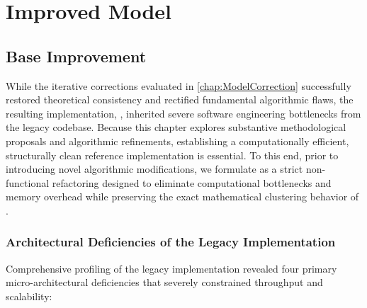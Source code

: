 \chapter{Improved Model}
\label{chap:ImprovedModel}

\section{Base Improvement}
\label{sec:base_improvement}

While the iterative corrections evaluated in \cref{chap:ModelCorrection} successfully restored theoretical consistency and rectified fundamental algorithmic flaws, the resulting implementation, , inherited severe software engineering bottlenecks from the legacy codebase. Because this chapter explores substantive methodological proposals and algorithmic refinements, establishing a computationally efficient, structurally clean reference implementation is essential. To this end, prior to introducing novel algorithmic modifications, we formulate  as a strict non-functional refactoring designed to eliminate computational bottlenecks and memory overhead while preserving the exact mathematical clustering behavior of .

\subsection{Architectural Deficiencies of the Legacy Implementation}

Comprehensive profiling of the legacy implementation revealed four primary micro-architectural deficiencies that severely constrained throughput and scalability:

